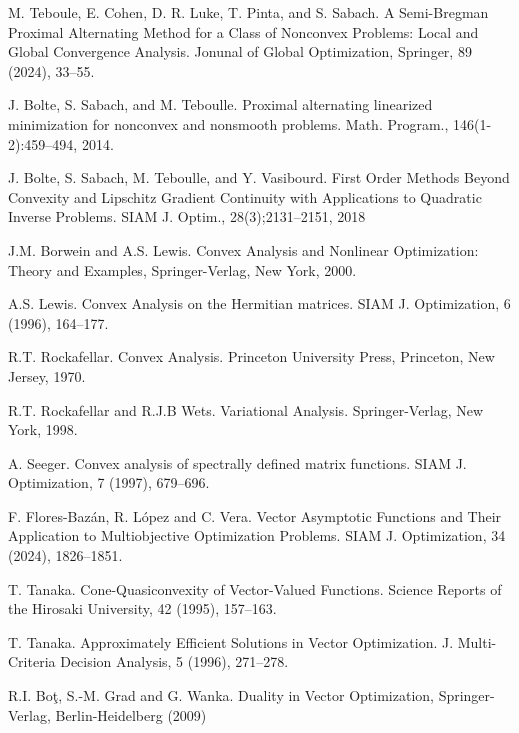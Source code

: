 \documentclass[a4paper,11pt]{jsarticle}
\theoremstyle{definition}
\begin{document}
\begin{thebibliography}{99}
  M. Teboule, E. Cohen, D. R. Luke, T. Pinta, and S. Sabach.
  A Semi-Bregman Proximal Alternating Method for a Class of Nonconvex Problems: Local and Global Convergence Analysis.
  Jonunal of Global Optimization, Springer, 89 (2024), 33--55.

  J. Bolte, S. Sabach, and M. Teboulle.
  Proximal alternating linearized minimization for nonconvex and nonsmooth problems.
  Math. Program., 146(1-2):459--494, 2014.

  J. Bolte, S. Sabach, M. Teboulle, and Y. Vasibourd.
  First Order Methods Beyond Convexity and Lipschitz Gradient Continuity with Applications to Quadratic Inverse Problems.
  SIAM J. Optim., 28(3);2131--2151, 2018


  J.M. Borwein and A.S. Lewis. Convex Analysis and Nonlinear Optimization: Theory and Examples, Springer-Verlag, New York, 2000.

  A.S. Lewis. Convex Analysis on the Hermitian matrices. SIAM J. Optimization, 6 (1996), 164--177.

  R.T. Rockafellar. Convex Analysis. Princeton University Press, Princeton, New Jersey, 1970.

  R.T. Rockafellar and R.J.B Wets. Variational Analysis. Springer-Verlag, New York, 1998.

  A. Seeger. Convex analysis of spectrally defined matrix functions. SIAM J. Optimization, 7 (1997), 679--696.

  F. Flores-Baz\'{a}n, R. L\'{o}pez and C. Vera. Vector Asymptotic Functions and Their Application to Multiobjective Optimization Problems. SIAM J. Optimization, 34 (2024), 1826--1851.

  T. Tanaka. Cone-Quasiconvexity of Vector-Valued Functions. Science Reports of the Hirosaki University, 42 (1995), 157--163.

  T. Tanaka. Approximately Efficient Solutions in Vector Optimization. J. Multi-Criteria Decision Analysis, 5 (1996), 271--278.

  R.I. Bo\c{t}, S.-M. Grad and G. Wanka. Duality in Vector Optimization, Springer-Verlag, Berlin-Heidelberg (2009)
\end{thebibliography}
\end{document}
